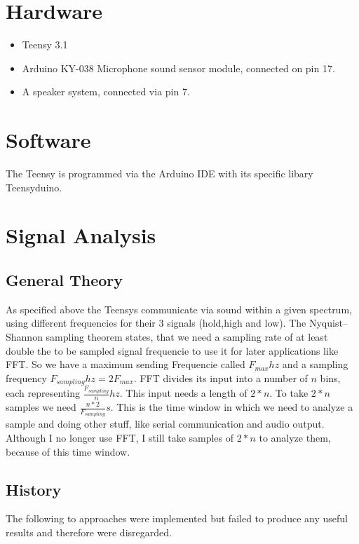 \documentclass{book}
\begin{document}
\section{Hardware}
\begin{itemize}
\item Teensy 3.1
\item Arduino KY-038 Microphone sound sensor module, connected on pin 17.
\item A speaker system, connected via pin 7.
\end{itemize}

\section{Software}
The Teensy is programmed via the Arduino IDE with its specific libary Teensyduino.


\section{Signal Analysis}
\subsection{General Theory}
As specified above the Teensys communicate via sound within a given spectrum, using different frequencies for their 3 signals (hold,high and low). The Nyquist–Shannon sampling theorem states, that we need a sampling rate of at least double the to be sampled signal frequencie to use it for later applications like FFT. So we have a maximum sending Frequencie called $F_{max}hz$ and a sampling frequency $F_{sampling}hz=2F_{max}$. FFT divides its input into a number of $n$ bins, each representing $\frac{F_{sampling}}{n}hz$. This input needs a length of $2*n$. To take $2*n$ samples we need $\frac{n*2}{F_{sampling}}s$. This is the time window in which we need to analyze a sample and doing other stuff, like serial communication and audio output. Although I no longer use FFT, I still take samples of $2*n$ to analyze them, because of this time window.

\subsection{History}
The following to approaches were implemented but failed to produce any useful results and therefore were disregarded.
\end{document}
